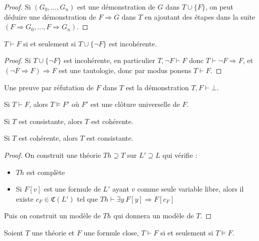 \documentclass[a4paper]{article}
\begin{document}
\begin{proof}
  Si $(G_0,\dots,G_n)$ est une démonstration de $G$ dans $T\cup\{F\}$, on peut déduire une démonstration de $F\Rightarrow G$ dans $T$ en ajoutant des étapes dans la suite $(F\Rightarrow G_0,\dots,F\Rightarrow G_n)$.
\end{proof}

\begin{corollary}
  $T\vdash F$ si et seulement si $T\cup\{\neg F\}$ est incohérente.
\end{corollary}

\begin{proof}
  Si $T\cup \{\neg F\}$ est incohérente, en particulier $T,\neg F\vdash F$ donc $T\vdash\neg F\Rightarrow F$, et $(\neg F\Rightarrow F)\Rightarrow F$ est une tautologie, donc par modus ponens $T\vdash F$.
\end{proof}

\begin{definition}
  Une preuve par réfutation de $F$ dans $T$ est la démonstration $T,F\vdash\bot$.
\end{definition}

\begin{theorem}
  Si $T \vdash F$, alors $T \models F'$ où $F'$ est une clôture universelle de $F$.
\end{theorem}

\begin{corollary}
  Si $T$ est consistante, alors $T$ est cohérente.
\end{corollary}

\begin{theorem}
  Si $T$ est cohérente, alors $T$ est consistante.
\end{theorem}

\begin{proof}
  On construit une théorie $Th\supseteq T$ sur $L'\supseteq L$ qui vérifie :
  \begin{itemize}
  \item $Th$ est complète
  \item Si $F[v]$ est une formule de $L'$ ayant $v$ comme seule variable libre, alors il existe $c_F\in \mathfrak{C}(L')$ tel que $Th\vdash\exists y\ F[y]\Rightarrow F[c_F]$
  \end{itemize}
  Puis on construit un modèle de $Th$ qui donnera un modèle de $T$.
\end{proof}

\begin{theorem}
  Soient $T$ une théorie et $F$ une formule close, $T\vdash F$ si et seulement si $T\models F$.
\end{theorem}
\end{document}
